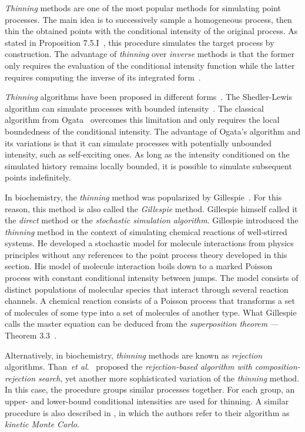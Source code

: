 \documentclass{juliacon}
\newcommand{\etal}{\textit{et al}.}
\begin{document}
\textit{Thinning} methods are one of the most popular methods for simulating point processes. The main idea is to successively sample a homogeneous process, then thin the obtained points with the conditional intensity of the original process. As stated in Proposition 7.5.I~\cite{daley2003}, this procedure simulates the target process by construction. The advantage of \textit{thinning} over \textit{inverse} methods is that the former only requires the evaluation of the conditional intensity function while the latter requires computing the inverse of its integrated form~\cite{daley2003}.

\textit{Thinning} algorithms have been proposed in different forms~\cite{daley2003}. The Shedler-Lewis algorithm can simulate processes with bounded intensity~\cite{lewis1976}. The classical algorithm from Ogata~\cite{ogata1981} overcomes this limitation and only requires the local boundedness of the conditional intensity. The advantage of Ogata's algorithm and its variations is that it can simulate processes with potentially unbounded intensity, such as self-exciting ones. As long as the intensity conditioned on the simulated history remains locally bounded, it is possible to simulate subsequent points indefinitely.

In biochemistry, the \textit{thinning} method was popularized by Gillespie~\cite{gillespie1976,gillespie1977}. For this reason, this method is also called the \textit{Gillespie} method. Gillespie himself called it the \textit{direct} method or the \textit{stochastic simulation algorithm}. Gillespie introduced the \textit{thinning} method in the context of simulating chemical reactions of well-stirred systems. He developed a stochastic model for molecule interactions from physics principles without any references to the point process theory developed in this section. His model of molecule interaction boils down to a marked Poisson process with constant conditional intensity between jumps. The model consists of distinct populations of molecular species that interact through several reaction channels. A chemical reaction consists of a Poisson process that transforms a set of molecules of some type into a set of molecules of another type. What Gillespie calls the master equation can be deduced from the \textit{superposition theorem} --- Theorem 3.3~\cite{last2017}.

Alternatively, in biochemistry, \textit{thinning} methods are known as \textit{rejection} algorithms. Than~\etal~\cite{thanh2014,thanh2017} proposed the \textit{rejection-based algorithm with composition-rejection search}, yet another more sophisticated variation of the \textit{thinning} method. In this case, the procedure groups similar processes together. For each group, an upper- and lower-bound conditional intensities are used for thinning. A similar procedure is also described in \cite{slepoy2008}, in which the authors refer to their algorithm as \textit{kinetic Monte Carlo}.
\end{document}
